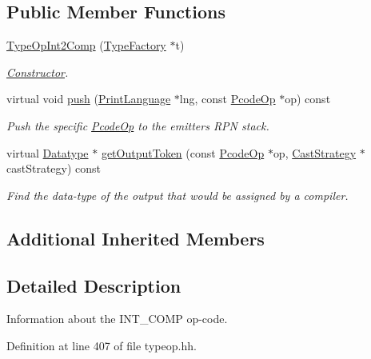 \subsection*{Public Member Functions}
\begin{DoxyCompactItemize}
\item 
\mbox{\hyperlink{class_type_op_int2_comp_a97ed2f9cfc61e0586b2fd89d9dbf4261}{Type\+Op\+Int2\+Comp}} (\mbox{\hyperlink{class_type_factory}{Type\+Factory}} $\ast$t)
\begin{DoxyCompactList}\small\item\em \mbox{\hyperlink{class_constructor}{Constructor}}. \end{DoxyCompactList}\item 
virtual void \mbox{\hyperlink{class_type_op_int2_comp_a4be303917727668a8290533e71352070}{push}} (\mbox{\hyperlink{class_print_language}{Print\+Language}} $\ast$lng, const \mbox{\hyperlink{class_pcode_op}{Pcode\+Op}} $\ast$op) const
\begin{DoxyCompactList}\small\item\em Push the specific \mbox{\hyperlink{class_pcode_op}{Pcode\+Op}} to the emitter\textquotesingle{}s R\+PN stack. \end{DoxyCompactList}\item 
virtual \mbox{\hyperlink{class_datatype}{Datatype}} $\ast$ \mbox{\hyperlink{class_type_op_int2_comp_aa418bd590316df07485e1673c08b900f}{get\+Output\+Token}} (const \mbox{\hyperlink{class_pcode_op}{Pcode\+Op}} $\ast$op, \mbox{\hyperlink{class_cast_strategy}{Cast\+Strategy}} $\ast$cast\+Strategy) const
\begin{DoxyCompactList}\small\item\em Find the data-\/type of the output that would be assigned by a compiler. \end{DoxyCompactList}\end{DoxyCompactItemize}
\subsection*{Additional Inherited Members}


\subsection{Detailed Description}
Information about the I\+N\+T\+\_\+C\+O\+MP op-\/code. 

Definition at line 407 of file typeop.\+hh.



